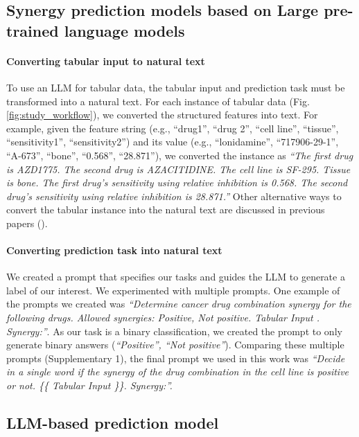 \subsection{Synergy prediction models based on Large pre-trained language models}
\label{sec:convert}

\paragraph{Converting tabular input to natural text}
To use an LLM for tabular data, the tabular input and prediction task must be transformed into a natural text. For each instance of tabular data (Fig. \ref{fig:study_workflow}), we converted the structured features into text. For example, given the feature string (e.g., ``drug1'', ``drug 2'', ``cell line'', ``tissue'', ``sensitivity1'', ``sensitivity2'') and its value (e.g., ``lonidamine'', ``717906-29-1'', ``A-673'', ``bone'', ``0.568'', ``28.871''), we converted the instance as \emph{``The first drug is AZD1775. The second drug is AZACITIDINE. The cell line is SF-295. Tissue is bone. The first drug's sensitivity using relative inhibition is 0.568. The second drug's sensitivity using relative inhibition is 28.871.''} Other alternative ways to convert the tabular instance into the natural text are discussed in previous papers (\cite{li_deep_2020, narayan_can_2022}).

\paragraph{Converting prediction task into natural text}
We created a prompt that specifies our tasks and guides the LLM to generate a label of our interest. We experimented with multiple prompts. One example of the prompts we created was \emph{``Determine cancer drug combination synergy for the following drugs. Allowed synergies: {{Positive, Not positive}}. {{ Tabular Input }}. Synergy:''}. As our task is a binary classification, we created the prompt to only generate binary answers (\emph{``Positive'', ``Not positive''}).  Comparing these multiple prompts (Supplementary 1), the final prompt we used in this work was \emph{``Decide in a single word if the synergy of the drug combination in the cell line is positive or not. \{\{ Tabular Input \}\}. Synergy:''.}

\subsection{LLM-based prediction model}
\label{sec:llm-prediction-model}

